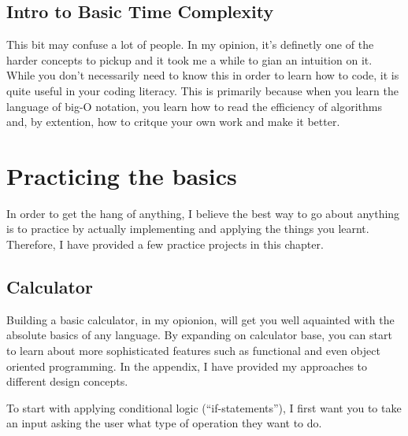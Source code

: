 \documentclass[12pt,a4paper]{book}
\begin{document}
		\section{Intro to Basic Time Complexity}
			This bit may confuse a lot of people. In my opinion, it's definetly one of the harder concepts to pickup and it took me a while to gian an intuition on it. While you don't necessarily need to know this in order to learn how to code, it is quite useful in your coding literacy. This is primarily because when you learn the language of big-O notation, you learn how to read the efficiency of algorithms and, by extention, how to critque your own work and make it better.
			\vspace{20cm}
		
	\chapter{Practicing the basics}	\label{chap:basics-practice}
		In order to get the hang of anything, I believe the best way to go about anything is to practice by actually implementing and applying the things you learnt. Therefore, I have provided a few practice projects in this chapter.
		\section{Calculator}
			Building a basic calculator, in my opionion, will get you well aquainted with the absolute basics of any language. By expanding on calculator base, you can start to learn about more sophisticated features such as functional and even object oriented programming. In the appendix, I have provided my approaches to different design concepts.
			
			To start with applying conditional logic (``if-statements''), I first want you to take an input 
			asking the user what type of operation they want to do.
			
\end{document}
